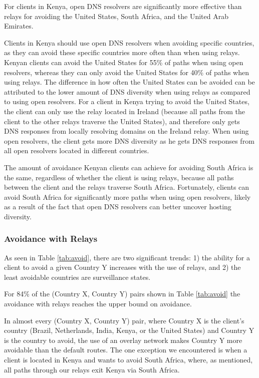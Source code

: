 \begin{finding}
For clients in Kenya, open DNS resolvers are significantly more
effective than relays for 
avoiding the United States, South Africa, and the United Arab Emirates.
\end{finding}
\noindent
Clients in Kenya should use open DNS resolvers when avoiding specific
countries, as they can avoid these specific countries more often than
when using relays.  Kenyan clients can avoid the United States for 55\%
of paths when using open resolvers, whereas they can only avoid the United States for 40\% of
paths when using relays.  The difference in how often the United States can be avoided can be
attributed to the lower amount of DNS diversity when using relays as
compared to using open resolvers. For a client in Kenya trying to avoid
the United States, the client can only use the relay located in Ireland
(because all paths from the client to the other relays traverse the
United States), and therefore only gets DNS responses from locally
resolving domains on the Ireland relay.  When using open resolvers, the
client gets more DNS diversity as he gets DNS responses from all open
resolvers located in different countries. 

The amount of avoidance Kenyan clients can achieve for avoiding South Africa is the same,
regardless of whether the client is using relays, because all paths
between the client and the relays traverse South Africa.  Fortunately,
clients can avoid South Africa for significantly more paths when using
open resolvers, likely as a result of the fact that open DNS resolvers
can better uncover hosting diversity.   

\subsubsection{Avoidance with Relays}
As seen in Table \ref{tab:avoid}, there are two significant trends: 1) the ability for a client to avoid a given Country Y increases with the use of relays, and 2) the least avoidable countries are surveillance states.

\begin{finding}
For 84\% of the (Country X, Country Y) pairs shown in Table \ref{tab:avoid} the avoidance with relays reaches the upper bound on avoidance. 
\end{finding}
\noindent
In almost every (Country X, Country Y) pair, where Country X is the
client's country (Brazil, Netherlands, India, Kenya, or the United
States) and Country Y is the country to avoid, the use of an overlay
network makes Country Y more avoidable than the default routes.  The one
exception we encountered is when a client is located in Kenya and wants
to avoid South Africa, where, as mentioned, all paths through our
relays exit Kenya via South Africa.

